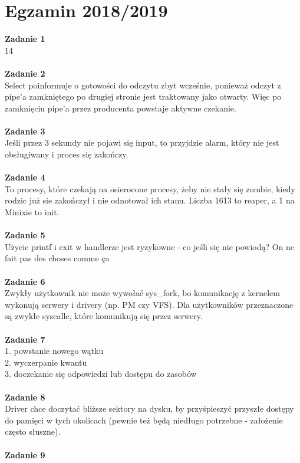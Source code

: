\documentclass[12pt, a4paper, polish, openany]{book}
\begin{document}
\section{Egzamin 2018/2019}
\textbf{Zadanie 1} \\
14 \\\\
\textbf{Zadanie 2} \\
Select poinformuje o gotowości do odczytu zbyt wcześnie, ponieważ odczyt z pipe'a zamkniętego po drugiej stronie jest traktowany jako otwarty. Więc po zamknięciu pipe'a przez producenta powstaje aktywne czekanie. \\\\
\textbf{Zadanie 3} \\
Jeśli przez 3 sekundy nie pojawi się input, to przyjdzie alarm, który nie jest obsługiwany i proces się zakończy. \\\\
\textbf{Zadanie 4} \\
To procesy, które czekają na osierocone procesy, żeby nie stały się zombie, kiedy rodzic  już sie zakończył i nie odnotował ich stanu. Liczba 1613 to reaper, a 1 na Minixie to init. \\\\
\textbf{Zadanie 5} \\
Użycie printf i exit w handlerze jest ryzykowne - co jeśli się nie powiodą? On ne fait pas des choses comme ça \\\\
\textbf{Zadanie 6} \\
Zwykły użytkownik nie może wywołać sys\_fork, bo komunikację z kernelem wykonują serwery i drivery (np. PM czy VFS). Dla użytkowników przeznaczone są zwykłe syscalle, które komunikują się przez serwery. \\\\
\textbf{Zadanie 7} \\
1. powstanie nowego wątku \\
2. wyczerpanie kwantu \\
3. doczekanie się odpowiedzi lub dostępu do zasobów \\\\
\textbf{Zadanie 8} \\
Driver chce doczytać bliższe sektory na dysku, by przyśpieszyć przyszłe dostępy do pamięci w tych okolicach (pewnie też będą niedługo potrzebne - założenie często słuszne). \\\\
\textbf{Zadanie 9} \\
\end{document}
